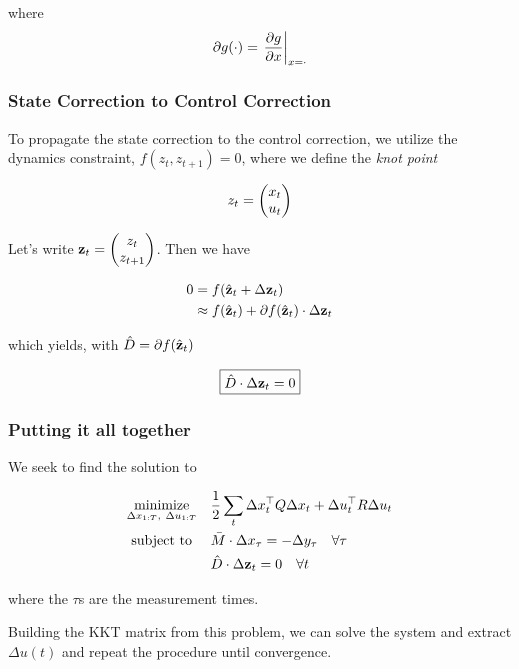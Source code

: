 \documentclass{article}
\begin{document}
where 
$$
\partial g(\cdot) = \eval{\pdv{g}{x}}_{x = \cdot} 
$$

\subsubsection*{State Correction to Control Correction}

To propagate the state correction to the control correction, we utilize the dynamics constraint, $f(z_t, z_{t+1}) = 0$, where we define the \textit{knot point} 

$$
z_t =\mqty(x_t \\ u_t)
$$


Let's write $\vb{z}_t = \mqty(z_t \\ z_{t+1})$. Then we have

\begin{align*}
0 &= f( \hat{\vb{z}}_t + \Delta {\vb{z}}_t) \\
&\approx f(\hat{\vb{z}}_t) + \partial f(\hat{\vb{z}}_t) \cdot \Delta {\vb{z}}_t \\
\end{align*}


which yields, with $\hat D = \partial f(\hat{\vb{z}}_t)$

\begin{equation}
  \boxed{
  \hat D \cdot \Delta {\vb{z}}_t = 0
  }
\end{equation}


\subsubsection*{Putting it all together}

We seek to find the solution to

\begin{align*}
  \underset{\Delta x_{1:T},\ \Delta u_{1:T}}{\text{minimize}} & \quad \frac{1}{2} \sum_t \Delta x^\top_t Q \Delta x_t + \Delta u^\top_t R \Delta u_t \\
  \text{subject to} \ & 
  \quad \bar M \cdot \Delta x_\tau = - \Delta y_\tau \quad \forall \tau \\
  & \quad \hat D \cdot \Delta {\vb{z}}_t = 0 \quad \forall t
\end{align*}


where the $\tau$s are the measurement times.

\hfill


Building the KKT matrix from this problem, we can solve the system and extract $\Delta u(t)$ and repeat the procedure until convergence.
\end{document}
